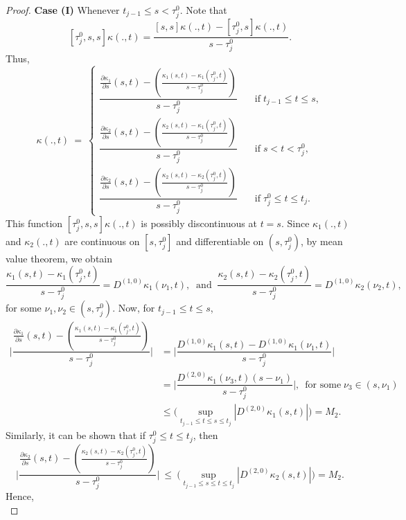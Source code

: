 \documentclass[sn-mathphys-num]{sn-jnl}%
\theoremstyle{thmstyleone}%
\theoremstyle{thmstyletwo}%
\theoremstyle{thmstylethree}%
\begin{document}
\begin{proof}
	\noindent
	\textbf{Case (I)}
	Whenever $t_{j-1} \le s < \tau_j^0$. Note that
	$$
	[\tau_j^0,s,s]\kappa(.,t) =\dfrac{[s,s]\kappa(.,t)-[\tau_j^0,s]\kappa(.,t)}{s-\tau_j^0}.
	$$
	Thus,
	\begin{equation*}
		[\tau_j^0,s,s]\kappa(.,t) ~=~
		\begin{cases}
			\dfrac{\frac{\partial \kappa_1}{\partial s}(s,t)- \left ( \frac{\kappa_1(s,t)-\kappa_1(\tau_j^0,t)}{s-\tau_j^0}\right) }{s-\tau_j^0}  \quad &\text{if}\; t_{j-1} \le t \le s,\\
			\dfrac{\frac{\partial \kappa_2}{\partial s}(s,t)- \left ( \frac{\kappa_2(s,t)-\kappa_1(\tau_j^0,t)}{s-\tau_j^0}\right) }{s-\tau_j^0}  \quad &\text{if}\; s < t < \tau_j^0, \\
			\dfrac{\frac{\partial \kappa_2}{\partial s}(s,t)- \left ( \frac{\kappa_2(s,t)-\kappa_2(\tau_j^0,t)}{s-\tau_j^0}\right) }{s-\tau_j^0}  \quad &\text{if}\; \tau_j^0 \le t \le t_j.
		\end{cases}
	\end{equation*}
	This function $[\tau_j^0,s,s]\kappa(.,t)$ is possibly discontinuous at $t= s$.
	Since $\kappa_1(.,t)$ and $\kappa_2(.,t)$ are continuous on $[s, \tau_j^0]$ and differentiable on $(s, \tau_j^0)$, by mean value theorem, we obtain
	$$
	\frac{\kappa_1(s,t)-\kappa_1(\tau_j^0,t)}{s-\tau_j^0} = D^{(1,0)}\kappa_1(\nu_1,t), \;\; \text{and} \;\; \frac{\kappa_2(s,t)-\kappa_2(\tau_j^0,t)}{s-\tau_j^0} = D^{(1,0)}\kappa_2(\nu_2,t),
	$$
	for some $\nu_1, \nu_2 \in (s, \tau_j^0)$.	Now, for $t_{j-1} \le t \le s$,
	\begin{align*}
		\Bigg | \dfrac{\frac{\partial \kappa_1}{\partial s} (s,t)- \left ( \frac{\kappa_1(s,t)-\kappa_1(\tau_j^0,t)}{s-\tau_j^0}\right )}{s-\tau_j^0} \Bigg | &= \Bigg | \dfrac{ D^{(1,0)}\kappa_1(s,t)- D^{(1,0)}\kappa_1(\nu_1,t)}{s-\tau_j^0} \Bigg | \nonumber \\
		&= \Bigg | \dfrac{ D^{(2,0)}\kappa_1(\nu_3,t)(s-\nu_1)}{s-\tau_j^0} \Bigg |,~  \; \text{for some} \; \nu_3 \in (s, \nu_1) \nonumber \\
		&\le \bigg (\sup_{t_{j-1} \le t \le s \le t_j} \left| D^{(2,0)} \kappa_1(s,t)\right| \bigg ) = M_2. 
	\end{align*}
	Similarly, it can be shown that if $\tau_j^0 \le t \le t_j$, then
	$$
	\Bigg | \dfrac{\frac{\partial \kappa_2}{\partial s}(s,t) - \left ( \frac{\kappa_2(s,t)-\kappa_2(\tau_j^0,t)}{s-\tau_j^0}\right )}{s-\tau_j^0} \Bigg | \: \le \: \bigg (\sup_{t_{j-1} \le s \le t \le t_j} \left| D^{(2,0)} \kappa_2(s,t)\right| \bigg )= M_2.
	$$
	Hence, \begin{equation}\label{Eq: 14}

\end{equation}
\end{proof}
\end{document}
